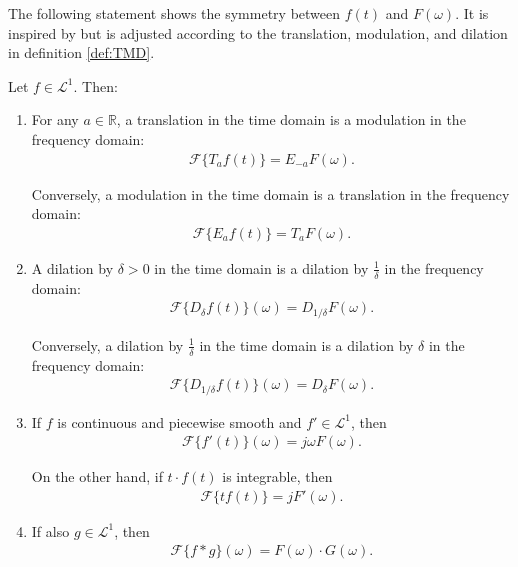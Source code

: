 \noindent
The following statement shows the symmetry between $f(t)$ and $F(\omega)$. It is inspired by \cite{page 214, FAA} but is adjusted according to the translation, modulation, and dilation in definition \ref{def:TMD}.

\begin{theorem} \label{theorem:fund_sym_Fourier}
Let $f \in \mathcal{L}^1$. Then:

\begin{enumerate}[label=(\alph*)]
\item For any $a \in \mathbb{R}$, a translation in the time domain is a modulation in the frequency domain: \label{theorem:fund_sym_Fourier_a}
\begin{align*}
\mathcal{F}\{T_a f(t)\} = E_{-a} F(\omega).
\end{align*}

Conversely, a modulation in the time domain is a translation in the frequency domain:
\begin{align*}
\mathcal{F}\{E_a f(t)\} = T_a F(\omega).
\end{align*}

\item A dilation by $\delta > 0$ in the time domain is a dilation by $\frac{1}{\delta}$ in the frequency domain:
\label{theorem:fund_sym_Fourier_b}
\begin{align*}
\mathcal{F}\{D_\delta f(t)\}(\omega) = D_{1/\delta} F(\omega).
\end{align*}

Conversely, a dilation by $\frac{1}{\delta}$ in the time domain is a dilation by $\delta$ in the frequency domain:
\begin{align*}
\mathcal{F}\{D_{1/\delta} f(t)\}(\omega) = D_\delta F(\omega).
\end{align*}

\item If $f$ is continuous and piecewise smooth and $f' \in \mathcal{L}^1$, then \label{theorem:fund_sym_Fourier_c}
\begin{align*}
\mathcal{F}\{f'(t)\}(\omega) = j\omega F(\omega).
\end{align*}

On the other hand, if $t\cdot f(t)$ is integrable, then
\begin{align*}
\mathcal{F}\{tf(t)\} = j F'(\omega).
\end{align*}

\item If also $g \in \mathcal{L}^1$, then \label{theorem:fund_sym_Fourier_d}
\begin{align*}
\mathcal{F}\{f*g\}(\omega) = F(\omega) \cdot G(\omega).
\end{align*}
\end{enumerate}
\end{theorem}

